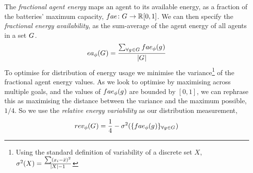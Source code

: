 \newcommand{\functionEnergyAvailable}[2]{
	\ifx \\#1\\
	\functionSignature{ea_{\varTime{}{}}}{\setAgents{}{}}
	\else
	\functionSignature{ea_{\varTime{}{}}}{#1}
	\fi
}
The \textit{fractional agent energy} maps an agent to its available energy, as a fraction of the batteries' maximum capacity, $\formalAgentEnergyAvailable{}{}$. We can then specify the \textit{fractional energy availability}, as the sum-average of the agent energy of all agents in a set $G_{}^{}$.
\begin{equation}
	\functionEnergyAvailable{}{} 
	= \dfrac{\sum_{\forall \varAgent{}{} \in \setAgents{}{}} \functionAgentEnergyAvailable{\varAgent{i}{}}{}}
	{\funcSize{\setAgents{}{}}}
\end{equation}
To optimise for distribution of energy usage we minimise the variance\footnote{Using the standard definition of variability of a discrete set $X$, $\sigma^2(X) = \frac{\sum (x_i - \bar{x})^2}{\lvert X \rvert-1}$} of the fractional agent energy values. As we look to optimise by maximising across multiple goals, and the values of $\functionAgentEnergyAvailable{}{}$ are bounded by $[0, 1]$, we can rephrase this as maximising the distance between the variance and the maximum possible, $1/4$. So we use the \textit{relative energy variability} as our distribution measurement,
\begin{equation}     	
	\functionEnergyVariability{}{} 
	= \frac{1}{4} - \sigma^2(
	\lbrace \functionAgentEnergyAvailable{}{}
	\rbrace_{\forall \varAgent{}{} \in \setAgents{}{}}
	)
\end{equation}


